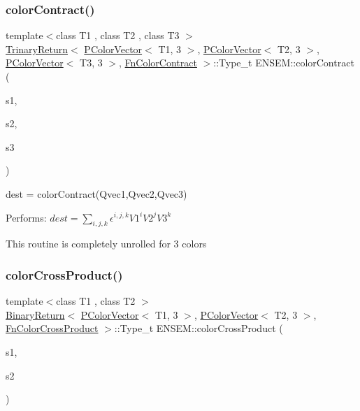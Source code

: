 \subsubsection{\texorpdfstring{colorContract()}{colorContract()}}
{\footnotesize\ttfamily template$<$class T1 , class T2 , class T3 $>$ \\
\mbox{\hyperlink{structENSEM_1_1TrinaryReturn}{Trinary\+Return}}$<$ \mbox{\hyperlink{classENSEM_1_1PColorVector}{P\+Color\+Vector}}$<$ T1, 3 $>$, \mbox{\hyperlink{classENSEM_1_1PColorVector}{P\+Color\+Vector}}$<$ T2, 3 $>$, \mbox{\hyperlink{classENSEM_1_1PColorVector}{P\+Color\+Vector}}$<$ T3, 3 $>$, \mbox{\hyperlink{structENSEM_1_1FnColorContract}{Fn\+Color\+Contract}} $>$\+::Type\+\_\+t E\+N\+S\+E\+M\+::color\+Contract (\begin{DoxyParamCaption}\item[{const \mbox{\hyperlink{classENSEM_1_1PColorVector}{P\+Color\+Vector}}$<$ T1, 3 $>$ \&}]{s1,  }\item[{const \mbox{\hyperlink{classENSEM_1_1PColorVector}{P\+Color\+Vector}}$<$ T2, 3 $>$ \&}]{s2,  }\item[{const \mbox{\hyperlink{classENSEM_1_1PColorVector}{P\+Color\+Vector}}$<$ T3, 3 $>$ \&}]{s3 }\end{DoxyParamCaption})\hspace{0.3cm}{\ttfamily [inline]}}



dest = color\+Contract(\+Qvec1,\+Qvec2,\+Qvec3) 

Performs\+: $dest = \sum_{i,j,k} \epsilon^{i,j,k} V1^{i} V2^{j} V3^{k}$

This routine is completely unrolled for 3 colors \mbox{\label{namespaceENSEM_a04433b1f7fdd4c3af3311092895168d7}} 
\subsubsection{\texorpdfstring{colorCrossProduct()}{colorCrossProduct()}}
{\footnotesize\ttfamily template$<$class T1 , class T2 $>$ \\
\mbox{\hyperlink{structENSEM_1_1BinaryReturn}{Binary\+Return}}$<$ \mbox{\hyperlink{classENSEM_1_1PColorVector}{P\+Color\+Vector}}$<$ T1, 3 $>$, \mbox{\hyperlink{classENSEM_1_1PColorVector}{P\+Color\+Vector}}$<$ T2, 3 $>$, \mbox{\hyperlink{structENSEM_1_1FnColorCrossProduct}{Fn\+Color\+Cross\+Product}} $>$\+::Type\+\_\+t E\+N\+S\+E\+M\+::color\+Cross\+Product (\begin{DoxyParamCaption}\item[{const \mbox{\hyperlink{classENSEM_1_1PColorVector}{P\+Color\+Vector}}$<$ T1, 3 $>$ \&}]{s1,  }\item[{const \mbox{\hyperlink{classENSEM_1_1PColorVector}{P\+Color\+Vector}}$<$ T2, 3 $>$ \&}]{s2 }\end{DoxyParamCaption})\hspace{0.3cm}{\ttfamily [inline]}}



